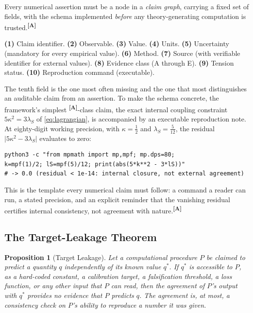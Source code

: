 \documentclass[12pt,a4paper,twoside]{article}
\theoremstyle{plain}
\newtheorem{proposition}[theorem]{Proposition}
\theoremstyle{definition}
\theoremstyle{remark}
\newcommand{\catmark}[1]{\textsuperscript{\textsf{\textbf{[#1]}}}}
\begin{document}
Every numerical assertion must be a node in a \emph{claim graph},
carrying a fixed set of fields, with the schema implemented \emph{before}
any theory-generating computation is trusted.\catmark{A}

\begin{governancebox}
\textbf{(1)} Claim identifier. \quad \textbf{(2)} Observable. \quad
\textbf{(3)} Value. \quad \textbf{(4)} Units. \quad
\textbf{(5)} Uncertainty (mandatory for every empirical value). \quad
\textbf{(6)} Method. \quad \textbf{(7)} Source (with verifiable
identifier for external values). \quad \textbf{(8)} Evidence class (A
through E). \quad \textbf{(9)} Tension status. \quad
\textbf{(10)} Reproduction command (executable).
\end{governancebox}

\noindent The tenth field is the one most often missing and the one that
most distinguishes an auditable claim from an assertion. To make the
schema concrete, the framework's simplest \catmark{A}-class claim, the
exact internal coupling constraint $5\kappa^2 = 3\lambda_S$ of
\cref{eq:lagrangian}, is accompanied by an executable reproduction note.
At eighty-digit working precision, with $\kappa = \tfrac{1}{2}$ and
$\lambda_S = \tfrac{5}{12}$, the residual
$\lvert 5\kappa^2 - 3\lambda_S\rvert$ evaluates to zero:
\begin{verbatim}
python3 -c "from mpmath import mp,mpf; mp.dps=80;
k=mpf(1)/2; lS=mpf(5)/12; print(abs(5*k**2 - 3*lS))"
# -> 0.0 (residual < 1e-14: internal closure, not external agreement)
\end{verbatim}
This is the template every numerical claim must follow: a command a
reader can run, a stated precision, and an explicit reminder that the
vanishing residual certifies internal consistency, not agreement with
nature.\catmark{A}

\subsection{The Target-Leakage Theorem}
\label{subsec:target-leakage-theorem}

\begin{proposition}[Target Leakage]
\label{prop:target-leakage}
Let a computational procedure $P$ be claimed to predict a quantity $q$
independently of its known value $q^{\ast}$. If $q^{\ast}$ is accessible
to $P$, as a hard-coded constant, a calibration target, a falsification
threshold, a loss function, or any other input that $P$ can read, then
the agreement of $P$'s output with $q^{\ast}$ provides no evidence that
$P$ predicts $q$. The agreement is, at most, a consistency check on
$P$'s ability to reproduce a number it was given.
\end{proposition}
\end{document}
